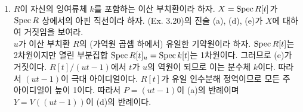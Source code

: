 \begin{enumerate}[label=\tb{3.\arabic*.},itemindent=0mm,itemsep=4mm]
	(I, \S 1)에서의 적절한 결과들을 사용하여 다음을 증명하라.
	\begin{enumerate}[label=(\alph*)]
	\item 임의의 닫힌점 $P\in X$에 대하여 $\dim X=\dim\mc O_P$이다. (환의 차원은 항상 Krull 차원을 의미한다.)
	\item $K(X)$가 $X$의 함수체라 하자. (Ex. 3.6) 그 경우 $\dim X=\trd K(X)/k$이다.
	\item 만약 $Y$가 $X$의 닫힌 부분집합이면 $\codim(Y,X)=\inf\sx{\dim\mc O_{P,X}}{P\in Y}$이다.
	\item 만약 $Y$가 $X$의 닫힌 부분집합이면 $\dim Y+\codim(Y,X)=\dim X$이다.
	\item 만약 $U$가 $X$의 공집합이 아닌 열린 부분집합이면 $\dim U=\dim X$이다.
	\item 만약 $k\bseq k'$이 체 확대이면 $X'=X\times_kk'$의 모든 기약 성분이 차원 $\dim X$를 가진다.
	\end{enumerate}
	\sol
	\item $R$이 자신의 잉여류체 $k$를 포함하는 이산 부치환이라 하자. $X=\operatorname{Spec} R[t]$가 $\operatorname{Spec} R$ 상에서의 아핀 직선이라 하자.
	(Ex. 3.20)의 진술 (a), (d), (e)가 $X$에 대하여 거짓임을 보여라.\\
	\sol $u$가 이산 부치환 $R$의 (가역원 곱셈 하에서) 유일한 기약원이라 하자.
	$\operatorname{Spec} R[t]$는 2차원이지만 열린 부분집합 $\operatorname{Spec} R[t]_u=\operatorname{Spec} k[t]$는 1차원이다. 그러므로 (e)가 거짓이다.
	$R[t]/(ut-1)$에서 $t$가 $u$의 역원이 되므로 이는 분수체 $k$이다. 따라서 $(ut-1)$이 극대 아이디얼이다.
	$R[t]$가 유일 인수분해 정역이므로 모든 주 아이디얼이 높이 1이다.
	따라서 $P=(ut-1)$이 (a)의 반례이며 $Y=V((ut-1))$이 (d)의 반례이다.\\
	\end{enumerate}
